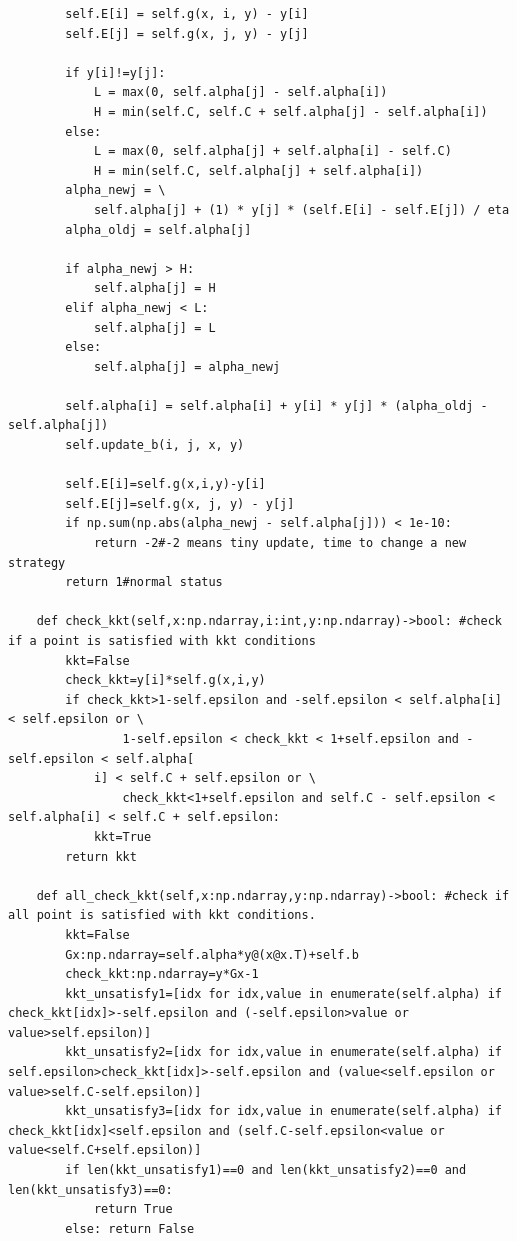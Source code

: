 \documentclass{article}
\begin{document}
\begin{verbatim}
        self.E[i] = self.g(x, i, y) - y[i]
        self.E[j] = self.g(x, j, y) - y[j]

        if y[i]!=y[j]:
            L = max(0, self.alpha[j] - self.alpha[i])
            H = min(self.C, self.C + self.alpha[j] - self.alpha[i])
        else:
            L = max(0, self.alpha[j] + self.alpha[i] - self.C)
            H = min(self.C, self.alpha[j] + self.alpha[i])
        alpha_newj = \
            self.alpha[j] + (1) * y[j] * (self.E[i] - self.E[j]) / eta
        alpha_oldj = self.alpha[j]

        if alpha_newj > H:
            self.alpha[j] = H
        elif alpha_newj < L:
            self.alpha[j] = L
        else:
            self.alpha[j] = alpha_newj

        self.alpha[i] = self.alpha[i] + y[i] * y[j] * (alpha_oldj - self.alpha[j])
        self.update_b(i, j, x, y)

        self.E[i]=self.g(x,i,y)-y[i]
        self.E[j]=self.g(x, j, y) - y[j]
        if np.sum(np.abs(alpha_newj - self.alpha[j])) < 1e-10:
            return -2#-2 means tiny update, time to change a new strategy
        return 1#normal status

    def check_kkt(self,x:np.ndarray,i:int,y:np.ndarray)->bool: #check if a point is satisfied with kkt conditions
        kkt=False
        check_kkt=y[i]*self.g(x,i,y)
        if check_kkt>1-self.epsilon and -self.epsilon < self.alpha[i] < self.epsilon or \
                1-self.epsilon < check_kkt < 1+self.epsilon and -self.epsilon < self.alpha[
            i] < self.C + self.epsilon or \
                check_kkt<1+self.epsilon and self.C - self.epsilon < self.alpha[i] < self.C + self.epsilon:
            kkt=True
        return kkt

    def all_check_kkt(self,x:np.ndarray,y:np.ndarray)->bool: #check if all point is satisfied with kkt conditions. 
        kkt=False
        Gx:np.ndarray=self.alpha*y@(x@x.T)+self.b
        check_kkt:np.ndarray=y*Gx-1
        kkt_unsatisfy1=[idx for idx,value in enumerate(self.alpha) if check_kkt[idx]>-self.epsilon and (-self.epsilon>value or value>self.epsilon)]
        kkt_unsatisfy2=[idx for idx,value in enumerate(self.alpha) if self.epsilon>check_kkt[idx]>-self.epsilon and (value<self.epsilon or value>self.C-self.epsilon)]
        kkt_unsatisfy3=[idx for idx,value in enumerate(self.alpha) if check_kkt[idx]<self.epsilon and (self.C-self.epsilon<value or value<self.C+self.epsilon)]
        if len(kkt_unsatisfy1)==0 and len(kkt_unsatisfy2)==0 and len(kkt_unsatisfy3)==0:
            return True
        else: return False


\end{verbatim}
\end{document}
